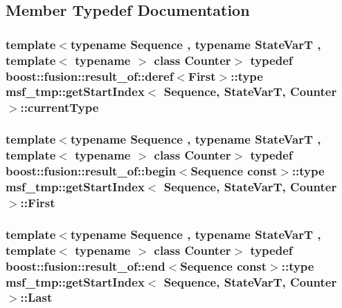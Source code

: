 \subsection{Member Typedef Documentation}
\hypertarget{structmsf__tmp_1_1getStartIndex_a53bb8aad63f0647cd38ebd138fb065ea}{
\subsubsection[{current\-Type}]{\setlength{\rightskip}{0pt plus 5cm}template$<$typename Sequence , typename State\-Var\-T , template$<$ typename $>$ class Counter$>$ typedef boost\-::fusion\-::result\-\_\-of\-::deref$<${\bf First}$>$\-::type {\bf msf\-\_\-tmp\-::get\-Start\-Index}$<$ Sequence, State\-Var\-T, Counter $>$\-::{\bf current\-Type}}}\label{structmsf__tmp_1_1getStartIndex_a53bb8aad63f0647cd38ebd138fb065ea}
\hypertarget{structmsf__tmp_1_1getStartIndex_a1cc5754b8602cfbd8e61f73cff974a6b}{
\subsubsection[{First}]{\setlength{\rightskip}{0pt plus 5cm}template$<$typename Sequence , typename State\-Var\-T , template$<$ typename $>$ class Counter$>$ typedef boost\-::fusion\-::result\-\_\-of\-::begin$<$Sequence const$>$\-::type {\bf msf\-\_\-tmp\-::get\-Start\-Index}$<$ Sequence, State\-Var\-T, Counter $>$\-::{\bf First}}}\label{structmsf__tmp_1_1getStartIndex_a1cc5754b8602cfbd8e61f73cff974a6b}
\hypertarget{structmsf__tmp_1_1getStartIndex_ab21b8aa838fc319c251de994cb353f97}{
\subsubsection[{Last}]{\setlength{\rightskip}{0pt plus 5cm}template$<$typename Sequence , typename State\-Var\-T , template$<$ typename $>$ class Counter$>$ typedef boost\-::fusion\-::result\-\_\-of\-::end$<$Sequence const$>$\-::type {\bf msf\-\_\-tmp\-::get\-Start\-Index}$<$ Sequence, State\-Var\-T, Counter $>$\-::{\bf Last}}}\label{structmsf__tmp_1_1getStartIndex_ab21b8aa838fc319c251de994cb353f97}


